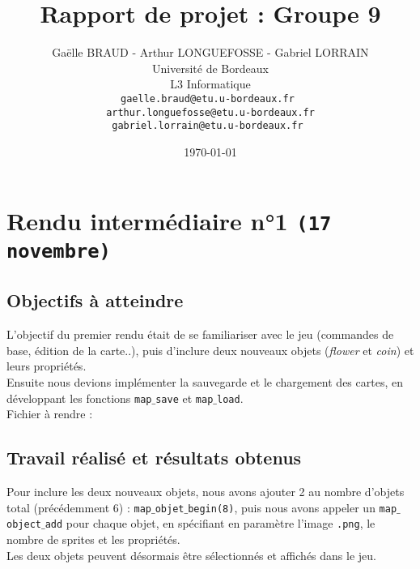 \documentclass[a4paper, 12pt]{article}
\date{\today}
\begin{document}
\title{Rapport de projet : Groupe 9 }
\author{Gaëlle BRAUD - Arthur LONGUEFOSSE - Gabriel LORRAIN \\
   Université de Bordeaux \\
   L3 Informatique \\
   \texttt{gaelle.braud@etu.u-bordeaux.fr } \\
   \texttt{arthur.longuefosse@etu.u-bordeaux.fr} \\
   \texttt{gabriel.lorrain@etu.u-bordeaux.fr }}
   
\maketitle
\tableofcontents

\newpage
\section{Rendu intermédiaire n°1 \texttt{(17 novembre)}} 
	\subsection{Objectifs à atteindre}
	L'objectif du premier rendu était de se familiariser avec le jeu (commandes de base, édition de la carte..), puis d'inclure deux nouveaux objets (\textit{flower} et \textit{coin}) et leurs propriétés. \\ 
	Ensuite nous devions implémenter la sauvegarde et le chargement des cartes, en développant les fonctions \texttt{map$\_$save} et \texttt{map$\_$load}.\\
	
	Fichier à rendre :
	
	
	\subsection{Travail réalisé et résultats obtenus}
	
	Pour inclure les deux nouveaux objets, nous avons ajouter 2 au nombre d'objets total (précédemment 6) : \texttt{map$\_$objet$\_$begin(8)}, puis nous avons appeler un \texttt{map$\_$object$\_$add} pour chaque objet, en spécifiant en paramètre l'image \texttt{.png}, le nombre de sprites et les propriétés. \\
Les deux objets peuvent désormais être sélectionnés et affichés dans le jeu. \\
\end{document}
